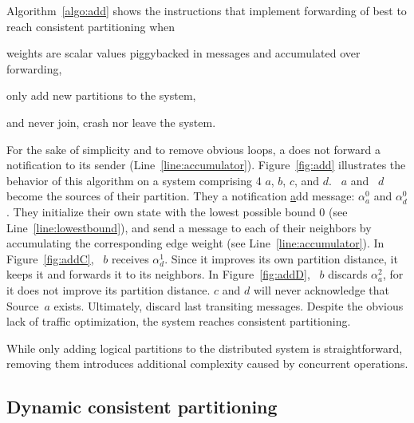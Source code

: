 Algorithm~\ref{algo:add} shows the instructions that implement
forwarding of best to reach consistent partitioning when
\begin{inparaenum}[(i)]
\item weights are scalar values piggybacked in messages and
  accumulated over forwarding,
\item \processes only add new partitions to the system,
\item and \processes never join, crash nor leave the system.
\end{inparaenum}
For the sake of simplicity and to remove obvious loops, a \process
does not forward a notification to its sender
(Line~\ref{line:accumulator}).  Figure~\ref{fig:add} illustrates the
behavior of this algorithm on a system comprising 4 \processes $a$,
$b$, $c$, and $d$. \Process~$a$ and \Process~$d$ become the sources of
their partition.  They \NAMEB a notification \underline{a}dd message:
$\alpha_a^0$ and $\alpha_d^0$. They initialize their own state with
the lowest possible bound $0$ (see Line~\ref{line:lowestbound}), and
send a message to each of their neighbors by accumulating the
corresponding edge weight (see Line~\ref{line:accumulator}). In
Figure~\ref{fig:addC}, \Process~$b$ receives $\alpha_{d}^{1}$. Since
it improves its own partition distance, it keeps it and forwards it to
its neighbors. In Figure~\ref{fig:addD}, \Process~$b$ discards
$\alpha_{a}^{2}$, for it does not improve its partition
distance. \Processes $c$ and $d$ will never acknowledge that
Source~$a$ exists. Ultimately, \processes discard last transiting
messages. Despite the obvious lack of traffic optimization, the system
reaches consistent partitioning.

While only adding logical partitions to the distributed system is
straightforward, removing them introduces additional complexity caused
by concurrent operations.

\subsection{Dynamic consistent partitioning}
\label{subsec:dynamic}


